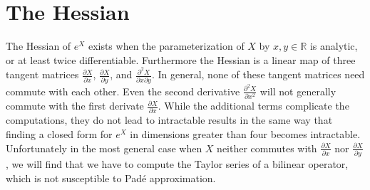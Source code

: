 \section{The Hessian}
The Hessian of $e^X$ exists when the parameterization of $X$ by $x,y \in \mathbb{R}$ is 
analytic, or at least twice differentiable. Furthermore the Hessian is a linear map of three
tangent matrices $\frac{\partial X}{\partial x}$, $\frac{\partial X}{\partial y}$, and $\frac{\partial^2 X}{\partial x \partial y}$.
In general, none of these tangent matrices need commute with each other. Even the second 
derivative $\frac{\partial^2 X}{\partial x^2}$ will not generally commute with the first 
derivate $\frac{\partial X}{\partial x}$. While the additional terms complicate the 
computations, they do not lead to intractable results in the same way that finding a closed
form for $e^X$ in dimensions greater than four becomes intractable. Unfortunately in the 
most general case when $X$ neither commutes with $\frac{\partial X}{\partial x}$ nor $\frac{\partial X}{\partial y}$,
we will find that we have to compute the Taylor series of a bilinear operator, which is not 
susceptible to Pad\'{e} approximation.

